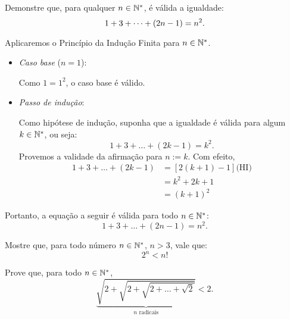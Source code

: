 \begin{example}
Demonstre que, para qualquer $n \in \mathbb{N}^*$, é válida a igualdade:
%
\begin{equation*}
1+3+\dots +\left(2n-1\right) = n^2.
\end{equation*}
\end{example}

\begin{solution}
Aplicaremos o Princípio da Indução Finita para $n \in \mathbb{N}^*$.
%
\begin{itemize}
	\item \textit{Caso base} ($n=1$):

	Como $1=1^2$, o caso base é válido.

	\item \textit{Passo de indução}:

	Como hipótese de indução, suponha que a igualdade é válida para algum $k\in \mathbb{N}^*$, ou seja:
	\begin{equation*}
	1+3+\dots+(2k-1) = k^2.
	\end{equation*}
	Provemos a validade da afirmação para $n := k$. Com efeito,
	\begin{align*}
	1+3+\dots + (2k-1) & = \left[2(k+1)-1\right] \text{(HI)} \\
	& = k^2+2k+1 \\
	& = (k+1)^2
	\end{align*}
\end{itemize}
%
Portanto, a equação a seguir é válida para todo $n \in \mathbb{N}^*$:
%
\begin{equation*}
1+3+\dots + (2n-1) = n^2.
\end{equation*}
\end{solution}

\begin{example}
Mostre que, para todo número $n \in \mathbb{N}^*$, $n>3$, vale que:
%
\begin{equation*}
2^n < n!
\end{equation*}
\end{example}

\begin{example}
Prove  que, para todo $n \in \mathbb{N}^*$,
%
\begin{equation*}
\underbrace{\sqrt{2+\sqrt{2+\sqrt{2+ \dots + \sqrt 2}}}}_{n  \text{ radicais}} < 2.
\end{equation*}
\end{example}

